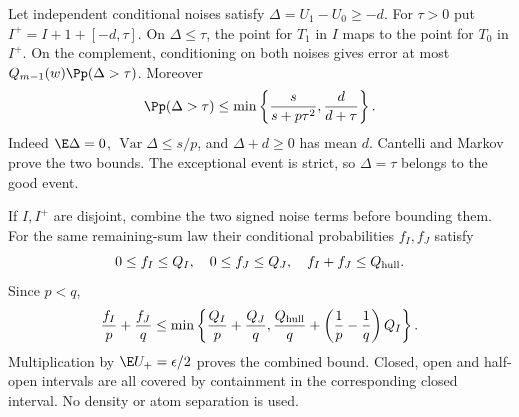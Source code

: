 Let independent conditional noises satisfy $\Delta=U_1-U_0\ge-d$.
For $\tau>0$ put $I^+=I+1+[-d,\tau]$. On $\Delta\le\tau$, the
point for $T_1$ in $I$ maps to the point for $T_0$ in $I^+$. On the
complement, conditioning on both noises gives error at most
$Q_{m-1}(w)\Pp(\Delta>\tau)$. Moreover
\begin{equation}\label{j:local:conf:bad}
 \Pp(\Delta>\tau)\le
 \min\left\{\frac{s}{s+p\tau^2},\frac d{d+\tau}\right\}.
\end{equation}
Indeed $\E\Delta=0$, $\operatorname{Var}\Delta\le s/p$, and
$\Delta+d\ge0$ has mean $d$. Cantelli and Markov prove the two bounds.
The exceptional event is strict, so $\Delta=\tau$ belongs to the good event.

If $I,I^+$ are disjoint, combine the two signed noise terms before
bounding them. For the same remaining-sum law their conditional
probabilities $f_I,f_J$ satisfy
\[
 0\le f_I\le Q_I,\quad0\le f_J\le Q_J,\quad f_I+f_J\le Q_{\rm hull}.
\]
Since $p<q$,
\[
 \frac{f_I}{p}+\frac{f_J}{q}
 \le\min\left\{\frac{Q_I}p+\frac{Q_J}q,
 \frac{Q_{\rm hull}}q+\left(\frac1p-\frac1q\right)Q_I\right\}.
\]
Multiplication by $\E U_+=\epsilon/2$ proves the combined bound.
Closed, open and half-open intervals are all covered by containment in
the corresponding closed interval. No density or atom separation is used.

